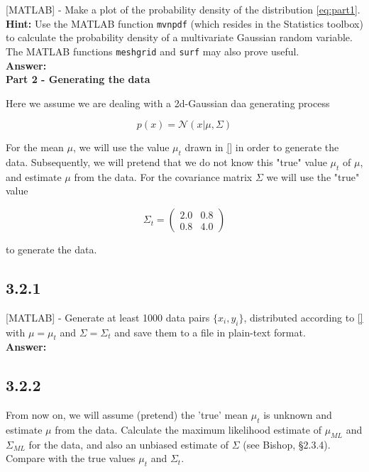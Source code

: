 \documentclass[a4paper]{article}
\begin{document}
[MATLAB] - Make a plot of the probability density of the distribution \ref{eq:part1}.\\

\textbf{Hint:} Use the MATLAB function \texttt{mvnpdf} (which resides in the Statistics toolbox) to calculate the probability density of a multivariate Gaussian random variable. The MATLAB functions \texttt{meshgrid} and \texttt{surf} may also prove useful.\\


\textbf{Answer:}\\

\textbf{Part 2 - Generating the data}

Here we assume we are dealing with a 2d-Gaussian daa generating process

\begin{equation}
	p(x) = \mathcal{N}(x|\mu, \Sigma)
\end{equation}

For the mean $\mu$, we will use the value $\mu_t$ drawn in \ref{} in order to generate the data. Subsequently, we will pretend that we do not know this "true" value $\mu_t$ of $\mu$, and estimate $\mu$ from the data. For the covariance matrix $\Sigma$ we will use the "true" value

\[ \Sigma_t = \left( \begin{array}{cc}
2.0 & 0.8  \\
0.8 & 4.0 \end{array} \right)\] 

to generate the data.


\subsection*{3.2.1}

[MATLAB] - Generate at least 1000 data pairs $\{ x_i, y_i\}$, distributed according to \ref{} with $\mu = \mu_t$ and $\Sigma = \Sigma_t$ and save them to a file in plain-text format.\\

\textbf{Answer:}\\



\subsection*{3.2.2}

From now on, we will assume (pretend) the 'true' mean $\mu_t$ is unknown and estimate $\mu$ from the data. Calculate the maximum likelihood estimate of $\mu_{ML}$ and $\Sigma_{ML}$ for the data, and also an unbiased estimate of $\Sigma$ (see Bishop, §2.3.4). Compare with the true values $\mu_t$ and $\Sigma_t$.\\
\end{document}
